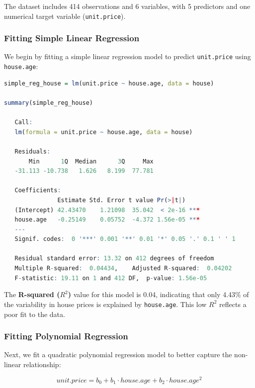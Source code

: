 \documentclass[
]{book}
\newcommand{\passthrough}[1]{#1}
\theoremstyle{definition}
\theoremstyle{definition}
\theoremstyle{definition}
\theoremstyle{definition}
\theoremstyle{remark}
\begin{document}
The dataset includes 414 observations and 6 variables, with 5 predictors and one numerical target variable (\passthrough{\lstinline!unit.price!}).

\subsubsection*{Fitting Simple Linear Regression}\label{fitting-simple-linear-regression}

We begin by fitting a simple linear regression model to predict \passthrough{\lstinline!unit.price!} using \passthrough{\lstinline!house.age!}:

\begin{lstlisting}[language=R]
simple_reg_house = lm(unit.price ~ house.age, data = house)

summary(simple_reg_house)
   
   Call:
   lm(formula = unit.price ~ house.age, data = house)
   
   Residuals:
       Min      1Q  Median      3Q     Max 
   -31.113 -10.738   1.626   8.199  77.781 
   
   Coefficients:
               Estimate Std. Error t value Pr(>|t|)    
   (Intercept) 42.43470    1.21098  35.042  < 2e-16 ***
   house.age   -0.25149    0.05752  -4.372 1.56e-05 ***
   ---
   Signif. codes:  0 '***' 0.001 '**' 0.01 '*' 0.05 '.' 0.1 ' ' 1
   
   Residual standard error: 13.32 on 412 degrees of freedom
   Multiple R-squared:  0.04434,    Adjusted R-squared:  0.04202 
   F-statistic: 19.11 on 1 and 412 DF,  p-value: 1.56e-05
\end{lstlisting}

The \textbf{R-squared (\(R^2\))} value for this model is 0.04, indicating that only 4.43\% of the variability in house prices is explained by \passthrough{\lstinline!house.age!}. This low \(R^2\) reflects a poor fit to the data.

\subsubsection*{Fitting Polynomial Regression}\label{fitting-polynomial-regression}

Next, we fit a quadratic polynomial regression model to better capture the non-linear relationship:

\[
unit.price = b_0 + b_1 \cdot house.age + b_2 \cdot house.age^2
\]
\end{document}
